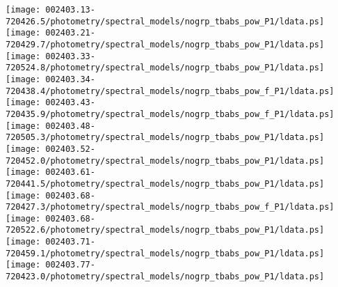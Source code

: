 \documentclass{aastex}
\begin{document}
\begin{figure*}[!ht]
\centering
\texttt{[image: 002403.13-720426.5/photometry/spectral\_models/nogrp\_tbabs\_pow\_P1/ldata.ps]} \hfill 
\texttt{[image: 002403.21-720429.7/photometry/spectral\_models/nogrp\_tbabs\_pow\_P1/ldata.ps]} \hfill 
\texttt{[image: 002403.33-720524.8/photometry/spectral\_models/nogrp\_tbabs\_pow\_P1/ldata.ps]} \\ 
\vspace*{0.5in}
\texttt{[image: 002403.34-720438.4/photometry/spectral\_models/nogrp\_tbabs\_pow\_f\_P1/ldata.ps]} \hfill 
\texttt{[image: 002403.43-720435.9/photometry/spectral\_models/nogrp\_tbabs\_pow\_f\_P1/ldata.ps]} \hfill 
\texttt{[image: 002403.48-720505.3/photometry/spectral\_models/nogrp\_tbabs\_pow\_P1/ldata.ps]} \\ 
\vspace*{0.5in}
\texttt{[image: 002403.52-720452.0/photometry/spectral\_models/nogrp\_tbabs\_pow\_P1/ldata.ps]} \hfill 
\texttt{[image: 002403.61-720441.5/photometry/spectral\_models/nogrp\_tbabs\_pow\_P1/ldata.ps]} \hfill 
\texttt{[image: 002403.68-720427.3/photometry/spectral\_models/nogrp\_tbabs\_pow\_f\_P1/ldata.ps]} \\ 
\vspace*{0.5in}
\texttt{[image: 002403.68-720522.6/photometry/spectral\_models/nogrp\_tbabs\_pow\_P1/ldata.ps]} \hfill 
\texttt{[image: 002403.71-720459.1/photometry/spectral\_models/nogrp\_tbabs\_pow\_P1/ldata.ps]} \hfill 
\texttt{[image: 002403.77-720423.0/photometry/spectral\_models/nogrp\_tbabs\_pow\_P1/ldata.ps]} \\ 
\vspace*{0.5in}
\end{figure*}
\clearpage
\end{document}
